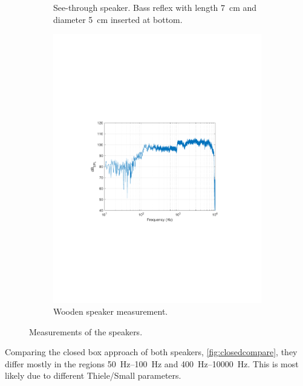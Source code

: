 \begin{figure}
\begin{subfigure}[t]{.5\textwidth}
		\caption{See-through speaker. Bass reflex with length \SI{7}{\centi\metre} and diameter \SI{5}{\centi\metre} inserted at bottom.}
		\label{fig:measPGbass}
	\end{subfigure}%
	\begin{subfigure}[t]{.5\textwidth}
		\centering
		\includegraphics[width=.9\linewidth, clip, trim={3.9cm 8.4cm 4.5cm 9cm}]{gfx/SpeakerMeas/PKclosed.pdf}
		\caption{Wooden speaker measurement.}
		\label{fig:measPK}
	\end{subfigure}
	\caption{Measurements of the speakers.}
	\label{fig:measAll}
\end{figure}

Comparing the closed box approach of both speakers, \cref{fig:closedcompare}, they differ mostly in the regions \SIrange{50}{100}{\hertz} and \SIrange{400}{10000}{\hertz}.
This is most likely due to different Thiele/Small parameters.

